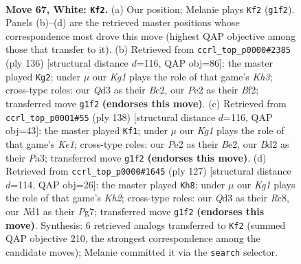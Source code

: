 \documentclass[11pt]{article}
\begin{document}
\clearpage

\begin{figure}[p]\centering
\begin{subfigure}{0.46\textwidth}\centering
\resizebox{\linewidth}{!}{%
\newchessgame
\chessboard[
  setfen={5r2/3qb3/5nk1/P1p2p1p/3p1Pp1/3Q4/1R1BP2P/3N2K1 w - - 9 67},
  showmover=false,
  pgfstyle=straightmove, color=movearrow, markmove={g1-f2}
]}
\caption{}
\end{subfigure}\hfill
\begin{subfigure}{0.46\textwidth}\centering
\resizebox{\linewidth}{!}{%
\newchessgame
\chessboard[
  setfen={q4k2/4n2p/1bp3pP/1p2PpP1/1P1P4/5Q1K/2B2B2/8 w - - 1 69},
  showmover=false,
  pgfstyle=straightmove, color=movearrow, markmove={h3-g2}
]}
\caption{}
\end{subfigure}
\\[4pt]
\begin{subfigure}{0.46\textwidth}\centering
\resizebox{\linewidth}{!}{%
\newchessgame
\chessboard[
  setfen={8/p1q2pk1/Qp4pp/3b4/6P1/P3PP2/4B1P1/4K3 w - - 73 70},
  showmover=false,
  pgfstyle=straightmove, color=movearrow, markmove={e1-f1}
]}
\caption{}
\end{subfigure}\hfill
\begin{subfigure}{0.46\textwidth}\centering
\resizebox{\linewidth}{!}{%
\newchessgame
\chessboard[
  setfen={2r5/1p1q1bpk/p4p1p/2P5/PP6/2Q2P1P/5BP1/R5K1 b - - 4 64},
  showmover=false,
  pgfstyle=straightmove, color=movearrow, markmove={h7-h8}
]}
\caption{}
\end{subfigure}
\caption{\textbf{Move 67, White: \texttt{Kf2}.} (a) Our position; Melanie plays \texttt{Kf2} (\texttt{g1f2}). Panels (b)--(d) are the retrieved master positions whose correspondence most drove this move (highest QAP objective among those that transfer to it). (b) Retrieved from \texttt{ccrl\_top\_p0000\#2385} (ply 136) [structural distance $d$=116, QAP obj=86]: the master played \texttt{Kg2}; under $\mu$ our \emph{Kg1} plays the role of that game's \emph{Kh3}; cross-type roles: our \emph{Q}d3 as their \emph{B}c2, our \emph{P}e2 as their \emph{B}f2; transferred move \texttt{g1f2} \textbf{(endorses this move)}. (c) Retrieved from \texttt{ccrl\_top\_p0001\#55} (ply 138) [structural distance $d$=116, QAP obj=43]: the master played \texttt{Kf1}; under $\mu$ our \emph{Kg1} plays the role of that game's \emph{Ke1}; cross-type roles: our \emph{P}e2 as their \emph{B}e2, our \emph{B}d2 as their \emph{P}a3; transferred move \texttt{g1f2} \textbf{(endorses this move)}. (d) Retrieved from \texttt{ccrl\_top\_p0000\#1645} (ply 127) [structural distance $d$=114, QAP obj=26]: the master played \texttt{Kh8}; under $\mu$ our \emph{Kg1} plays the role of that game's \emph{Kh2}; cross-type roles: our \emph{Q}d3 as their \emph{R}c8, our \emph{N}d1 as their \emph{P}g7; transferred move \texttt{g1f2} \textbf{(endorses this move)}. Synthesis: 6 retrieved analogs transferred to \texttt{Kf2} (summed QAP objective 210, the strongest correspondence among the candidate moves); Melanie committed it via the \texttt{search} selector.}
\label{fig:thought-m132}
\end{figure}
\end{document}
